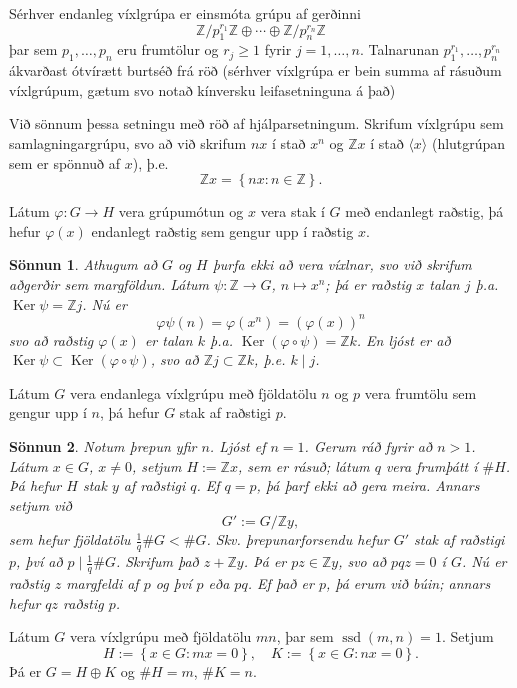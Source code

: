 \documentclass[a4paper,icelandic,11pt]{book}
\theoremstyle{plain}
\newtheorem*{sonnun}{Sönnun}
\newcommand{\Z}{\mathbb{Z}}
\DeclareMathOperator{\ssd}{ssd} %
\DeclareMathOperator{\Ker}{Ker} %
\begin{document}
\begin{setn}
  Sérhver endanleg víxlgrúpa er einsmóta grúpu af gerðinni
  \[
    \Z/p_1^{r_1}\Z \oplus \cdots \oplus \Z/p_n^{r_n}\Z
  \]
  þar sem $p_1,\dots,p_n$ eru frumtölur og $r_j \ge 1$ fyrir $j = 1,\dots,n$.
  Talnarunan $p_1^{r_1},\dots,p_n^{r_n}$ ákvarðast ótvírætt burtséð frá röð
  (sérhver víxlgrúpa er bein summa af rásuðum víxlgrúpum, gætum svo notað
  kínversku leifasetninguna á það)
\end{setn}
Við sönnum þessa setningu með röð af hjálparsetningum. Skrifum víxlgrúpu sem
samlagningargrúpu, svo að við skrifum $nx$ í stað $x^n$ og $\Z x$ í stað
$\langle x \rangle$ (hlutgrúpan sem er spönnuð af $x$), þ.e.
\[
  \Z x = \left\{ nx:n\in \Z \right\}.
\]
\begin{hjalparsetn}
  Látum $\varphi: G\to H$ vera grúpumótun og $x$ vera stak í $G$ með endanlegt
  raðstig, þá hefur $\varphi(x)$ endanlegt raðstig sem gengur upp í raðstig $x$.
\end{hjalparsetn}
\begin{sonnun}
  Athugum að $G$ og $H$ þurfa ekki að vera víxlnar, svo við skrifum aðgerðir sem
  margföldun. Látum $\psi:\Z \to G$, $n\mapsto x^n$; þá er raðstig $x$ talan
  $j$ þ.a. $\Ker\psi = \Z j$. Nú er
  \[
    \varphi\psi(n)= \varphi(x^n) = (\varphi(x))^n
  \]
  svo að raðstig $\varphi(x)$ er talan $k$ þ.a. $\Ker(\varphi\circ\psi) = \Z k$.
  En ljóst er að $\Ker\psi \subset \Ker(\varphi\circ\psi)$, svo að 
  $\Z j \subset \Z k$, þ.e. $k \mid j$.
\end{sonnun}
\begin{hjalparsetn}
  Látum $G$ vera endanlega víxlgrúpu með fjöldatölu $n$ og $p$ vera frumtölu sem
  gengur upp í $n$, þá hefur $G$ stak af raðstigi $p$.
\end{hjalparsetn}
\begin{sonnun}
  Notum þrepun yfir $n$. Ljóst ef $n = 1$. Gerum ráð fyrir að $n > 1$. Látum
  $x\in G$, $x\neq 0$, setjum $H:= \Z x$, sem er rásuð; látum $q$ vera frumþátt
  í $\# H$. Þá hefur $H$ stak $y$ af raðstigi $q$. Ef $q = p$, þá þarf ekki að gera
  meira. Annars setjum við
  \[
    G' := G/\Z y,
  \]
  sem hefur fjöldatölu $\frac 1q \#G < \#G$. Skv. þrepunarforsendu hefur
  $G'$ stak af raðstigi $p$, því að $p \mid \frac 1q \#G$. Skrifum það $z+\Z y$. Þá
  er $pz\in\Z y$, svo að $pqz = 0$ í $G$. Nú er raðstig $z$ margfeldi af
  $p$ og því $p$ eða $pq$. Ef það er $p$, þá erum við búin; annars hefur
  $qz$ raðstig $p$.
\end{sonnun}
\begin{hjalparsetn}
  Látum $G$ vera víxlgrúpu með fjöldatölu $mn$, þar sem $\ssd(m,n) = 1$. Setjum
  \begin{equation*}
  H := \left\{ x\in G: mx = 0 \right\},
  \quad
  K := \left\{ x\in G: nx = 0 \right\}.
  \end{equation*}
  Þá er $G = H\oplus K$ og $\#H = m$, $\#K = n$.
\end{hjalparsetn}
\end{document}
